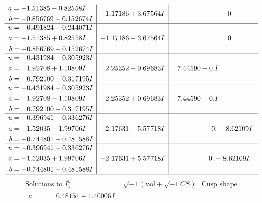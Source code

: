 \documentclass[1p]{elsarticle_modified}
\theoremstyle{definition}
\newcommand{\I}{\sqrt{-1}}
\begin{document}
$$\begin{array}{c|c|c}
\begin{aligned}
a &= -1.51385 - 0.82558 I \\
b &= -0.856769 + 0.152674 I\end{aligned}
 & -1.17186 + 3.67564 I & \phantom{-0.000000 } 0 \\ \hline\begin{aligned}
u &= -0.491824 - 0.244071 I \\
a &= -1.51385 + 0.82558 I \\
b &= -0.856769 - 0.152674 I\end{aligned}
 & -1.17186 - 3.67564 I & \phantom{-0.000000 } 0 \\ \hline\begin{aligned}
u &= -0.431984 + 0.305923 I \\
a &= \phantom{-}1.92708 + 1.10809 I \\
b &= \phantom{-}0.792100 - 0.317195 I\end{aligned}
 & \phantom{-}2.25352 - 0.69683 I & \phantom{-}7.44590 + 0. I\phantom{ +0.000000I} \\ \hline\begin{aligned}
u &= -0.431984 - 0.305923 I \\
a &= \phantom{-}1.92708 - 1.10809 I \\
b &= \phantom{-}0.792100 + 0.317195 I\end{aligned}
 & \phantom{-}2.25352 + 0.69683 I & \phantom{-}7.44590 + 0. I\phantom{ +0.000000I} \\ \hline\begin{aligned}
u &= -0.396941 + 0.336276 I \\
a &= -1.52035 - 1.99706 I \\
b &= -0.744801 + 0.481588 I\end{aligned}
 & -2.17631 - 5.57718 I & \phantom{-0.000000 -}0. + 8.62109 I \\ \hline\begin{aligned}
u &= -0.396941 - 0.336276 I \\
a &= -1.52035 + 1.99706 I \\
b &= -0.744801 - 0.481588 I\end{aligned}
 & -2.17631 + 5.57718 I & \phantom{-0.000000 } 0. - 8.62109 I\\
 \hline 
 \end{array}$$\newpage$$\begin{array}{c|c|c}  
\text{Solutions to }I^u_{1}& \I (\text{vol} + \sqrt{-1}CS) & \text{Cusp shape}\\
 \hline 
\begin{aligned}
u &= \phantom{-}0.48151 + 1.40006 I \\

\end{aligned}
\end{array}$$
\end{document}
